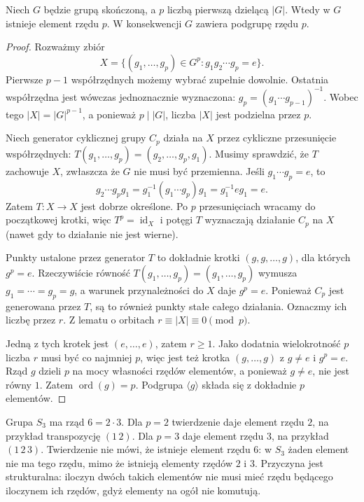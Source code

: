 \begin{twierdzenie}
\label{aa:tw:cauchy}
Niech $G$ będzie grupą skończoną, a $p$ liczbą pierwszą
dzielącą $|G|$. Wtedy w $G$ istnieje element rzędu $p$.
W konsekwencji $G$ zawiera podgrupę rzędu $p$.
\end{twierdzenie}
\begin{proof}
Rozważmy zbiór
\[
 X=\{(g_1,\ldots,g_p)\in G^p:g_1g_2\cdots g_p=e\}.
\]
Pierwsze $p-1$ współrzędnych możemy wybrać zupełnie dowolnie.
Ostatnia współrzędna jest wówczas jednoznacznie wyznaczona:
$g_p=(g_1\cdots g_{p-1})^{-1}$.
Wobec tego $|X|=|G|^{p-1}$, a ponieważ $p\mid |G|$,
liczba $|X|$ jest podzielna przez $p$.

Niech generator cyklicznej grupy $C_p$ działa na $X$
przez cykliczne przesunięcie współrzędnych:
$T(g_1,\ldots,g_p)=(g_2,\ldots,g_p,g_1)$.
Musimy sprawdzić, że $T$ zachowuje $X$, zwłaszcza że $G$
nie musi być przemienna. Jeśli $g_1\cdots g_p=e$, to
\[
 g_2\cdots g_p g_1
 =g_1^{-1}(g_1\cdots g_p)g_1
 =g_1^{-1}eg_1=e.
\]
Zatem $T:X\to X$ jest dobrze określone.
Po $p$ przesunięciach wracamy do początkowej krotki,
więc $T^p=\operatorname{id}_X$ i potęgi $T$ wyznaczają
działanie $C_p$ na $X$ (nawet gdy to działanie nie jest wierne).

Punkty ustalone przez generator $T$ to dokładnie krotki
$(g,g,\ldots,g)$, dla których $g^p=e$.
Rzeczywiście równość $T(g_1,\ldots,g_p)=(g_1,\ldots,g_p)$
wymusza $g_1=\cdots=g_p=g$,
a warunek przynależności do $X$ daje $g^p=e$.
Ponieważ $C_p$ jest generowana przez $T$,
są to również punkty stałe całego działania.
Oznaczmy ich liczbę przez $r$.
Z lematu o orbitach $r\equiv|X|\equiv0\pmod p$.

Jedną z tych krotek jest $(e,\ldots,e)$, zatem $r\ge1$.
Jako dodatnia wielokrotność $p$ liczba $r$ musi być
co najmniej $p$, więc jest też krotka $(g,\ldots,g)$
z $g\ne e$ i $g^p=e$.
Rząd $g$ dzieli $p$ na mocy własności rzędów elementów,
a ponieważ $g\ne e$, nie jest równy $1$.
Zatem $\operatorname{ord}(g)=p$.
Podgrupa $\langle g\rangle$ składa się z dokładnie $p$ elementów.
\end{proof}

\begin{przyklad}
Grupa $S_3$ ma rząd $6=2\cdot3$.
Dla $p=2$ twierdzenie daje element rzędu $2$,
na przykład transpozycję $(1\,2)$.
Dla $p=3$ daje element rzędu $3$,
na przykład $(1\,2\,3)$.
Twierdzenie nie mówi, że istnieje element rzędu $6$:
w $S_3$ żaden element nie ma tego rzędu, mimo że
istnieją elementy rzędów $2$ i $3$.
Przyczyna jest strukturalna: iloczyn dwóch takich elementów
nie musi mieć rzędu będącego iloczynem ich rzędów,
gdyż elementy na ogół nie komutują.
\end{przyklad}

